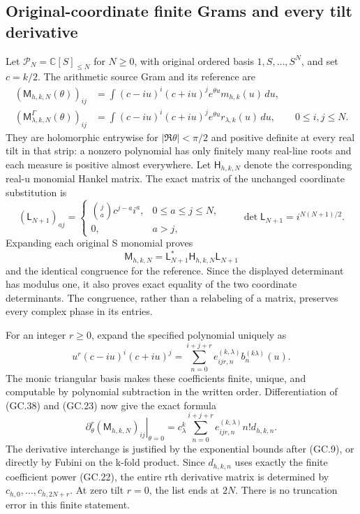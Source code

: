 \subsection{Original-coordinate finite Grams and every tilt derivative}

Let $\mathcal P_N=\mathbb C[S]_{\le N}$ for $N\ge0$, with original
ordered basis $1,S,\ldots,S^N$, and set $c=k/2$. The arithmetic
source Gram and its reference are
\[
 \begin{split}
 (\mathsf M_{h,k,N}(\theta))_{ij}
   &=\int(c-iu)^i(c+iu)^j e^{\theta u}m_{h,k}(u)\,du,\\
 (\mathsf M_{\lambda,k,N}^\Gamma(\theta))_{ij}
   &=\int(c-iu)^i(c+iu)^j e^{\theta u}r_{\lambda,k}(u)\,du,
 \qquad 0\le i,j\le N. 
 \end{split}                                                   \tag{GC.38}
\]
They are holomorphic entrywise for $|\Re\theta|<\pi/2$ and
positive definite at every real tilt in that strip: a nonzero
polynomial has only finitely many real-line roots and each measure
is positive almost everywhere. Let $\mathsf H_{h,k,N}$ denote
the corresponding real-u monomial Hankel matrix. The exact matrix
of the unchanged coordinate substitution is
\[
 (\mathsf L_{N+1})_{aj}=
 \begin{cases}\binom ja c^{j-a}i^a,&0\le a\le j\le N,\\
 0,&a>j,
 \end{cases}\qquad
 \det\mathsf L_{N+1}=i^{N(N+1)/2}.                            \tag{GC.39}
\]
Expanding each original S monomial proves
\[
 \mathsf M_{h,k,N}=\mathsf L_{N+1}^*\mathsf H_{h,k,N}
                                     \mathsf L_{N+1}            \tag{GC.40}
\]
and the identical congruence for the reference. Since the displayed
determinant has modulus one, it also proves exact equality of the
two coordinate determinants. The congruence, rather than a relabeling
of a matrix, preserves every complex phase in its entries.

For an integer $r\ge0$, expand the specified polynomial uniquely as
\[
 u^r(c-iu)^i(c+iu)^j
 =\sum_{n=0}^{i+j+r}e_{ijr,n}^{(k,\lambda)}b_n^{(k\lambda)}(u).
                                                               \tag{GC.41}
\]
The monic triangular basis makes these coefficients finite, unique,
and computable by polynomial subtraction in the written order.
Differentiation of (GC.38) and (GC.23) now give the exact formula
\[
 \boxed{\left.\partial_\theta^r
      (\mathsf M_{h,k,N})_{ij}\right|_{\theta=0}
 =c_\lambda^k\sum_{n=0}^{i+j+r}
                 e_{ijr,n}^{(k,\lambda)}n!d_{h,k,n}.}           \tag{GC.42}
\]
The derivative interchange is justified by the exponential bounds
after (GC.9), or directly by Fubini on the k-fold product. Since
$d_{h,k,n}$ uses exactly the finite coefficient power (GC.22), the
entire rth derivative matrix is determined by
$c_{h,0},\ldots,c_{h,2N+r}$. At zero tilt $r=0$, the list ends at
$2N$. There is no truncation error in this finite statement.

